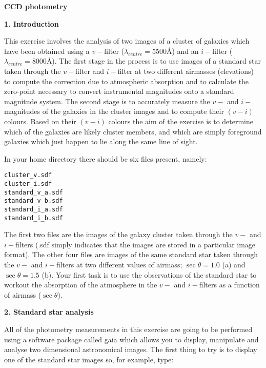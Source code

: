 \pagestyle{myheadings}
\setcounter{page}{1}

\begin{center}
{\Huge\bf CCD photometry}
\end{center}

{\bf \large{1. Introduction}}

This exercise involves the analysis of two images of a cluster of galaxies which have been obtained using a $v-$filter ($\lambda_{centre}=5500$\AA) and an $i-$filter ($\lambda_{centre}=8000$\AA). The first stage in the process is to use images of a standard star taken through the $v-$filter and $i-$filter at two different airmasses (elevations) to compute the correction due to atmospheric absorption and to calculate the zero-point necessary to convert instrumental magnitudes onto a standard magnitude system. The second stage is to accurately measure the $v-$ and $i-$magnitudes of the galaxies in the cluster images and to compute their $(v-i)$ colours. Based on their $(v-i)$ colours the aim of the exercise is to determine which of the galaxies are likely cluster members, and which are simply foreground galaxies which just happen to lie along the same line of sight.

\noindent
In your home directory there should be six files present, namely:

\verb,cluster_v.sdf,\\
\verb,cluster_i.sdf,\\
\verb,standard_v_a.sdf,\\
\verb,standard_v_b.sdf,\\
\verb,standard_i_a.sdf,\\
\verb,standard_i_b.sdf,

The first two files are the images of the galaxy cluster taken through the $v-$ and $i-$filters (.sdf simply indicates that the images are stored in a particular image format). The other four files are images of the same standard star taken through the $v-$ and $i-$filters at two different values of airmass; $\sec \theta=1.0$ (a) and $\sec \theta=1.5$ (b). Your first task is to use the observations of the standard star to workout the absorption of the atmosphere in the $v-$ and $i-$filters as a function of airmass ($\sec \theta$).

{\bf \large{2. Standard star analysis}}

All of the photometry measurements in this exercise are going to be performed using a software package called {\sc gaia} which allows you to display, manipulate and analyse two dimensional astronomical images. The first thing to try is to display one of the standard star images so, for example, type:

